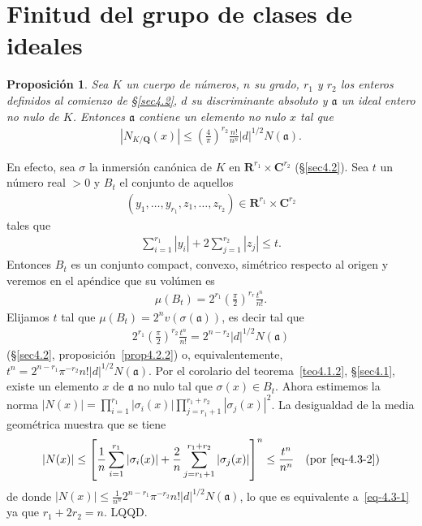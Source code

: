 \documentclass[bibtotoc,leqno,spanish]{amsbook}
\newcommand{\RR}{\mathbf{R}}
\newcommand{\QQ}{\mathbf{Q}}
\newcommand{\CC}{\mathbf{C}}
\newcommand{\idl}[1]{\mathfrak{#1}}
\newcommand{\QED}{LQQD.}
\newcommand{\abs}[1]{\left\lvert#1\right\rvert}
\numberwithin{equation}{section}
\theoremstyle{note}
\theoremstyle{note}
\newtheorem{proposition}{Proposici\'on}
\theoremstyle{rem}
\numberwithin{theorem}{section}
\numberwithin{proposition}{section}
\numberwithin{definition}{section}
\numberwithin{lemma}{section}
\numberwithin{corollary}{section}
\numberwithin{example}{section}
\numberwithin{footnote}{section}%
\begin{document}
\section{Finitud del grupo de clases de ideales}\label{sec4.3}

\begin{proposition}\label{prop4.3.1}
Sea $K$ un cuerpo de n\'umeros, $n$ su grado, $r_{1}$ y $r_{2}$ los enteros definidos al comienzo de
\S\ref{sec4.2}, $d$ su discriminante absoluto y $\idl{a}$ un ideal entero no nulo de $K$. Entonces $\idl{a}$
contiene un elemento no nulo $x$ tal que
\begin{gather}\label{eq-4.3-1}
\abs{N_{K/\QQ}(x)}\leq\left(\frac{4}{\pi}\right)^{r_{2}}\frac{n!}{n^{n}}\abs{d}^{1/2}N(\idl{a}).
\end{gather}
\end{proposition}

En efecto, sea $\sigma$ la inmersi\'on can\'onica de $K$ en $\RR^{r_{1}}\times\CC^{r_{2}}$ (\S\ref{sec4.2}).
Sea $t$ un n\'umero real $>0$ y $B_{t}$ el conjunto de aquellos
\begin{gather*}
(y_{1},\dots,y_{r_{1}},z_{1},\dots,z_{r_{2}})\in\RR^{r_{1}}\times\CC^{r_{2}}
\end{gather*}
tales que
\begin{gather}\label{eq-4.3-2}
\sum_{i=1}^{r_{1}}\abs{y_{i}}+2\sum_{j=1}^{r_{2}}\abs{z_{j}}\leq t.
\end{gather}
Entonces $B_{t}$ es un conjunto compact, convexo, sim\'etrico respecto al origen y veremos en el ap\'endice
que su vol\'umen es
\begin{gather}
\mu(B_{t}) = 2^{r_{1}}\left(\frac{\pi}{2}\right)^{r_{r}}\frac{t^{n}}{n!}.
\end{gather}
Elijamos $t$ tal que $\mu(B_{t}) = 2^{n}v(\sigma(\idl{a}))$, es decir tal que
\begin{gather*}
2^{r_{1}}\left(\frac{\pi}{2}\right)^{r_{2}}\frac{t^{n}}{n!} = 2^{n-r_{2}}\abs{d}^{1/2}N(\idl{a})
\end{gather*}
(\S\ref{sec4.2}, proposici\'on~\ref{prop4.2.2}) o, equivalentemente, $t^{n} = 2^{n-r_{1}}\pi^{-r_{2}}n!\abs{d}^{1/2}N(\idl{a})$.
Por el corolario del teorema~\ref{teo4.1.2}, \S\ref{sec4.1},
existe un elemento $x$ de $\idl{a}$ no nulo tal que $\sigma(x)\in B_{t}$.
Ahora estimemos la norma $\abs{N(x)} = \prod_{i=1}^{r_{1}}\abs{\sigma_{i}(x)}\prod_{j=r_{1}+1}^{r_{1}+r_{2}}\abs{\sigma_{j}(x)}^{2}$.
La desigualdad de la media geom\'etrica muestra que se tiene
\begin{gather*}
\abs{N(x)}\leq\left[\frac{1}{n}\sum_{i=1}^{r_{1}}\abs{\sigma_{i}(x)}+\frac{2}{n}\sum_{j=r_{1}+1}^{r_{1}+r_{2}}
\abs{\sigma_{j}(x)}\right]^{n}\leq\frac{t^{n}}{n^{n}}\quad(\text{por~\eqref{eq-4.3-2}})
\end{gather*}
de donde $\abs{N(x)}\leq\frac{1}{n^{n}}2^{n-r_{1}}\pi^{-r_{2}}n!\abs{d}^{1/2}N(\idl{a})$, lo que es equivalente
a~\eqref{eq-4.3-1} ya que $r_{1}+2r_{2} = n$. \QED
\end{document}
